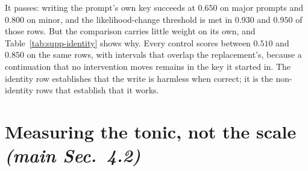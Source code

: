 \documentclass{article}
\begin{document}
It passes: writing the prompt's own key succeeds at $0.650$ on major prompts and $0.800$
on minor, and the likelihood-change threshold is met in $0.930$ and $0.950$ of those
rows. But the comparison carries little weight on its own, and
Table~\ref{tab:supp-identity} shows why. Every control scores between $0.510$ and
$0.850$ on the same rows, with intervals that overlap the replacement's, because a
continuation that no intervention moves remains in the key it started in. The identity
row establishes that the write is harmless when correct; it is the non-identity rows
that establish that it works.

\section{Measuring the tonic, not the scale \normalfont\textit{(main Sec.~4.2)}}
\label{sec:tonic}
%
\end{document}
